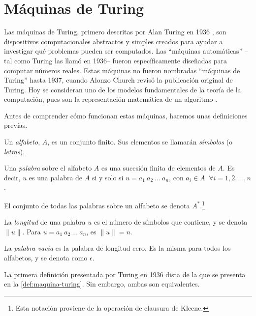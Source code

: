 
\section{Máquinas de Turing}\label{sec:maquinas-turing}

Las máquinas de Turing, primero descritas por Alan Turing en 1936 \cite{Turing1937}, son dispositivos computacionales abstractos y simples creados para ayudar a investigar qué problemas pueden ser computados. Las ``máquinas automáticas'' --tal como Turing las llamó en 1936-- fueron específicamente diseñadas para computar números reales. Estas máquinas no fueron nombradas ``máquinas de Turing'' hasta 1937, cuando Alonzo Church \cite{Church1937} revisó la publicación original de Turing. Hoy se consideran uno de los modelos fundamentales de la teoría de la computación, pues son la representación matemática de un algoritmo \cite{StanfordTuring2021}.

Antes de comprender cómo funcionan estas máquinas, haremos unas definiciones previas.

\begin{definicion}\label{def:preliminares}
Un \emph{alfabeto}, $A$, es un conjunto finito. Sus elementos se llamarán \emph{símbolos} (o \emph{letras}).

Una \emph{palabra} sobre el alfabeto $A$ es una sucesión finita de elementos de $A$. Es decir, $u$ es una palabra de $A$ si y solo si $u = a_1\:a_2\:...\:a_n$, con $a_i \in A \;\;\forall i = 1, 2, ..., n$.

El conjunto de todas las palabras sobre un alfabeto se denota $A^*$.\footnote{Esta notación proviene de la operación de clausura de Kleene.}

La \emph{longitud} de una palabra $u$ es el número de símbolos que contiene, y se denota $\|u\|$. Para $u = a_1\:a_2\:...\:a_n$, es $\|u\|=n$.

La \emph{palabra vacía} es la palabra de longitud cero. Es la misma para todos los alfabetos, y se denota como $\epsilon$.
\end{definicion}

La primera definición presentada por Turing en 1936 \cite{Turing1937} dista de la que se presenta en la \cref{def:maquina-turing}. Sin embargo, ambas son equivalentes.

